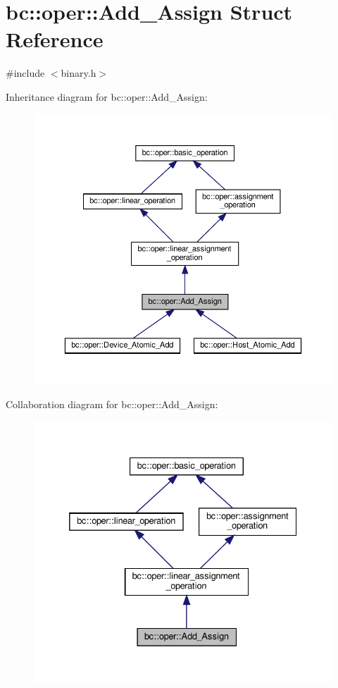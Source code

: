 \hypertarget{structbc_1_1oper_1_1Add__Assign}{}\section{bc\+:\+:oper\+:\+:Add\+\_\+\+Assign Struct Reference}
\label{structbc_1_1oper_1_1Add__Assign}


{\ttfamily \#include $<$binary.\+h$>$}



Inheritance diagram for bc\+:\+:oper\+:\+:Add\+\_\+\+Assign\+:\nopagebreak
\begin{figure}[H]
\begin{center}
\leavevmode
\includegraphics[width=350pt]{structbc_1_1oper_1_1Add__Assign__inherit__graph}
\end{center}
\end{figure}


Collaboration diagram for bc\+:\+:oper\+:\+:Add\+\_\+\+Assign\+:\nopagebreak
\begin{figure}[H]
\begin{center}
\leavevmode
\includegraphics[width=332pt]{structbc_1_1oper_1_1Add__Assign__coll__graph}
\end{center}
\end{figure}
